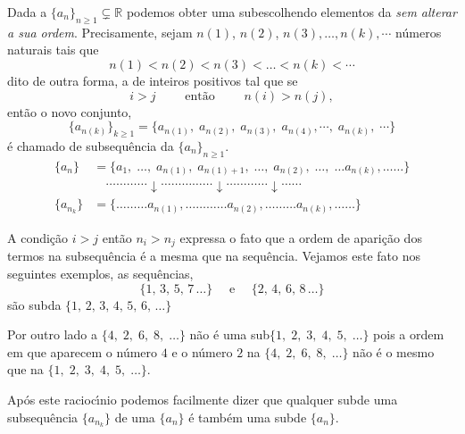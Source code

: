 Dada a \seq $\{a_n\}_{n\geq 1}\subsetneq \mathbb{R}$ podemos obter
uma sub\seq escolhendo elementos da \seq \textsl{sem alterar a sua
ordem}. Precisamente, sejam $n(1)$, $n(2)$, $n(3),\dots, n(k),\cdots$ n\'{u}meros naturais tais que
\begin{equation*}
n(1)<n(2)<n(3)<\dots<n(k)<\cdots
\end{equation*}
dito de outra forma, a \seq de inteiros positivos tal que se
\begin{equation*}
    i>j\qquad \text{ ent\~{a}o }\qquad n(i)>n(j),
\end{equation*}
ent\~{a}o o novo conjunto,
\begin{equation*}
\{a_{n(k)}\}_{k\geq 1}=\{a_{n(1)},\;a_{n(2)},\; a_{n(3)},\; a_{n(4)},\cdots,\; a_{n(k)},\;\cdots \}
\end{equation*}
\'{e} chamado de subsequ\^{e}ncia da \seq $\{a_n\}_{n\geq 1}$.
\begin{align*}
  \{a_n\}&=\{a_1,\;\ldots,\; a_{n(1)},\;a_{n(1)+1},\;\ldots,\; a_{n(2)},\;\ldots,\;\ldots  a_{n(k)},\ldots\ldots \}\\
       & \quad\ldots \dots\ldots\ldots \downarrow  \ldots\ldots\ldots \ldots \ldots \downarrow \ldots\ldots\ldots \ldots\downarrow\ldots \ldots\\
  \{a_{n_k}\}&=\{\dots\ldots \ldots a_{n(1)},\ldots\ldots\ldots \ldots a_{n(2)},\ldots\ldots\ldots a_{n(k)},\ldots \ldots  \}
\end{align*}

A condi\c{c}\~{a}o $i>j$ ent\~{a}o $n_i>n_j$ expressa o fato que a ordem de apari\c{c}\~{a}o dos termos na subsequ\^{e}ncia \'{e} a mesma que na sequ\^{e}ncia.
Vejamos este fato nos seguintes exemplos, as sequ\^{e}ncias,
\begin{equation*}
    \{1,\, 3,\, 5,\, 7\, \ldots  \}\quad\text{ e }\quad \{2,\, 4,\, 6,\, 8\, \ldots   \}
\end{equation*}
s\~{a}o sub\seqs da \seq $\{1,\, 2,\, 3,\, 4,\, 5,\, 6,\, \ldots   \}$

Por outro lado a \seq $\{4,\; 2,\; 6,\; 8,\; \ldots\}$  n\~{a}o \'{e} uma sub\seq $\{1,\; 2,\; 3,\; 4,\; 5,\;\ldots \}$ pois a ordem em que
aparecem o n\'{u}mero $4$ e o n\'{u}mero $2$ na \seq $\{4,\; 2,\; 6,\; 8,\; \ldots\}$  n\~{a}o \'{e} o mesmo que na \seq $\{1,\; 2,\; 3,\; 4,\; 5,\; \ldots \}$.

Ap\'{o}s este racioc\'{\i}nio podemos facilmente dizer que qualquer sub\seq de uma subsequ\^{e}ncia $\{a_{n_k}\}$  de uma  \seq  $\{a_{n}\}$ \'{e} tamb\'{e}m
uma sub\seq de $\{a_{n}\}$.

